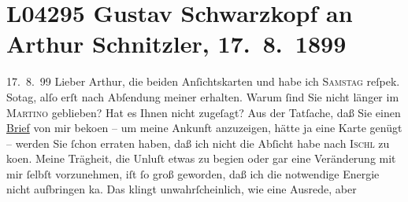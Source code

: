 

\section[Gustav Schwarzkopf an Arthur Schnitzler, 17. 8. 1899]{L04295 Gustav Schwarzkopf an Arthur Schnitzler, 17. 8. 1899}
\nopagebreak{}
\rehead{ }\normalsize\beginnumbering{}
\toendnotes[C]{\smallbreak\pagebreak[2]}
\toendnotes[C]{\smallbreak}
\toendnotes[C]{\smallbreak}
\pstart
           \raggedleft{}{\pb}17. 8. 99\pend
           \vspace{0.5em}
\pstart
           Lieber Arthur, die beiden Anſichtskarten \label{K_L04295-1v}\label{K_L04295-1} und \textsc{\label{K_L04295-2v}\label{K_L04295-2}} habe ich \textsc{Samstag} reſpek. So{\geminationn}tag, alſo erſt nach
               Abſendung meiner \label{K_L04295-3v}\label{K_L04295-3} erhalten. Warum{ }ſind Sie nicht länger im \textsc{Martino} geblieben? Hat es Ihnen nicht zugeſagt? Aus der Tatſache, daß Sie einen \uline{Brief} von mir beko{\geminationm}en –
               um meine Ankunft anzuzeigen, hätte ja eine Karte genügt – werden Sie{ }ſchon erraten
               haben, daß ich nicht die Abſicht habe nach \textsc{Ischl} zu ko{\geminationm}en. Meine Trägheit, die Unluſt etwas zu
                  begi{\geminationn}en oder gar eine Veränderung mit mir{ }ſelbſt
               vorzunehmen, iſt{ }ſo groß geworden, daß ich die notwendige Energie {\pb}nicht aufbringen ka{\geminationn}. Das klingt unwahrſcheinlich, wie eine Ausrede, aber
